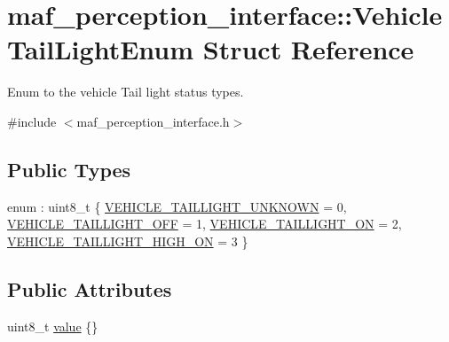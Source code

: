 \hypertarget{structmaf__perception__interface_1_1VehicleTailLightEnum}{}\section{maf\+\_\+perception\+\_\+interface\+:\+:Vehicle\+Tail\+Light\+Enum Struct Reference}
\label{structmaf__perception__interface_1_1VehicleTailLightEnum}


Enum to the vehicle Tail light status types.  




{\ttfamily \#include $<$maf\+\_\+perception\+\_\+interface.\+h$>$}

\subsection*{Public Types}
\begin{DoxyCompactItemize}
\item 
enum \+: uint8\+\_\+t \{ \hyperlink{structmaf__perception__interface_1_1VehicleTailLightEnum_ace587f471fe53b8674bbf9d9633f49fbac29dcaf4eee315c2ff86b1cb9df1f0e2}{V\+E\+H\+I\+C\+L\+E\+\_\+\+T\+A\+I\+L\+L\+I\+G\+H\+T\+\_\+\+U\+N\+K\+N\+O\+WN} = 0, 
\hyperlink{structmaf__perception__interface_1_1VehicleTailLightEnum_ace587f471fe53b8674bbf9d9633f49fba1c2d75e474667c54a4f05647f291274a}{V\+E\+H\+I\+C\+L\+E\+\_\+\+T\+A\+I\+L\+L\+I\+G\+H\+T\+\_\+\+O\+FF} = 1, 
\hyperlink{structmaf__perception__interface_1_1VehicleTailLightEnum_ace587f471fe53b8674bbf9d9633f49fbabb2d6e2d17cb0159d9bb1df28b3ad8d5}{V\+E\+H\+I\+C\+L\+E\+\_\+\+T\+A\+I\+L\+L\+I\+G\+H\+T\+\_\+\+ON} = 2, 
\hyperlink{structmaf__perception__interface_1_1VehicleTailLightEnum_ace587f471fe53b8674bbf9d9633f49fba4c5cc1c91574672a314760026cac673a}{V\+E\+H\+I\+C\+L\+E\+\_\+\+T\+A\+I\+L\+L\+I\+G\+H\+T\+\_\+\+H\+I\+G\+H\+\_\+\+ON} = 3
 \}
\end{DoxyCompactItemize}
\subsection*{Public Attributes}
\begin{DoxyCompactItemize}
\item 
uint8\+\_\+t \hyperlink{structmaf__perception__interface_1_1VehicleTailLightEnum_a8914e1676bd04d2b635ddb030cd25e29}{value} \{\}
\end{DoxyCompactItemize}


